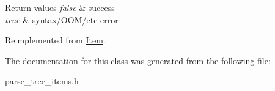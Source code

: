 \begin{DoxyRetVals}{Return values}
{\em false} & success \\
\hline
{\em true} & syntax/\+O\+O\+M/etc error \\
\hline
\end{DoxyRetVals}


Reimplemented from \mbox{\hyperlink{classItem_a0757839d09aa77bfd92bfe071f257ae9}{Item}}.



The documentation for this class was generated from the following file\+:\begin{DoxyCompactItemize}
\item 
parse\+\_\+tree\+\_\+items.\+h\end{DoxyCompactItemize}
